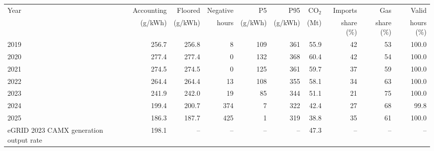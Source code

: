 \begin{tabular}{lrrrrrrrrr}
\toprule
Year & Accounting & Floored & Negative & P5 & P95 & CO$_2$ & Imports & Gas & Valid \\
 & (g/kWh) & (g/kWh) & hours & (g/kWh) & (g/kWh) & (Mt) & share (\%) & share (\%) & hours (\%) \\
\midrule
2019 & 256.7 & 256.8 & 8 & 109 & 361 & 55.9 & 42 & 53 & 100.0 \\
2020 & 277.4 & 277.4 & 0 & 132 & 368 & 60.4 & 42 & 54 & 100.0 \\
2021 & 274.5 & 274.5 & 0 & 125 & 361 & 59.7 & 37 & 59 & 100.0 \\
2022 & 264.4 & 264.4 & 13 & 108 & 355 & 58.1 & 34 & 63 & 100.0 \\
2023 & 241.9 & 242.0 & 19 & 85 & 344 & 51.1 & 21 & 75 & 100.0 \\
2024 & 199.4 & 200.7 & 374 & 7 & 322 & 42.4 & 27 & 68 & 99.8 \\
2025 & 186.3 & 187.7 & 425 & 1 & 319 & 38.8 & 35 & 61 & 100.0 \\
\midrule
eGRID 2023 CAMX generation output rate & 198.1 & -- & -- & -- & -- & 47.3 & -- & -- & -- \\
\bottomrule
\end{tabular}